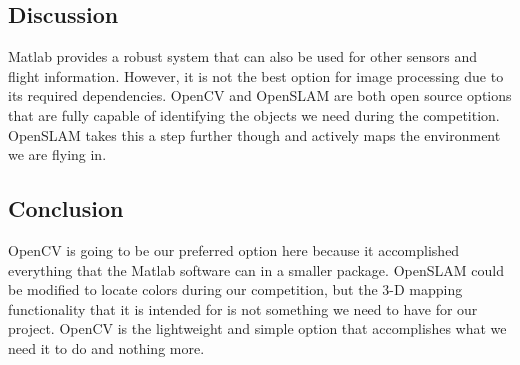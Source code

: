 \documentclass[onecolumn, draftclsnofoot,10pt, compsoc]{IEEEtran}
\begin{document}

\subsection{Discussion}

Matlab provides a robust system that can also be used for other 
sensors and flight information. However, it is not the best option 
for image processing due to its required dependencies. OpenCV and 
OpenSLAM are both open source options that are fully capable of 
identifying the objects we need during the competition. OpenSLAM 
takes this a step further though and actively maps the environment 
we are flying in. 

\subsection{Conclusion}

OpenCV is going to be our preferred option here because it 
accomplished everything that the Matlab software can in a smaller 
package. OpenSLAM could be modified to locate colors during our 
competition, but the 3-D mapping functionality that it is intended 
for is not something we need to have for our project. OpenCV is the 
lightweight and simple option that accomplishes what we need it to 
do and nothing more. 

\vspace{2mm}



\end{document}
